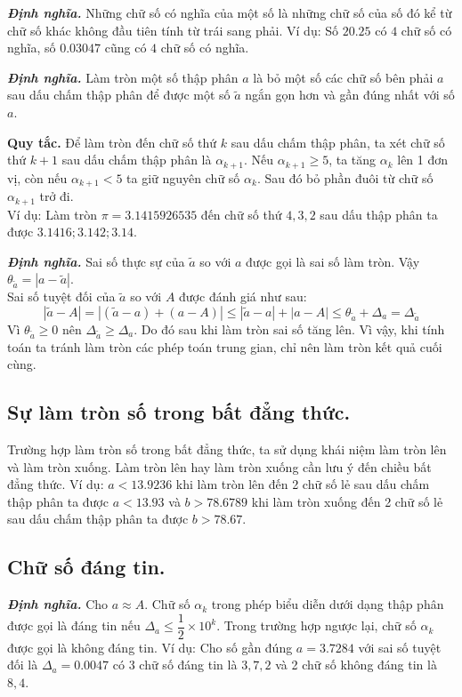 \documentclass[12pt, a4paper]{report}
\def\DN{\textbf{\textit{Định nghĩa. }}}
\begin{document}
\DN Những chữ số có nghĩa của một số là những chữ số của số đó kể từ chữ số khác không đầu tiên tính từ trái sang phải. Ví dụ: Số $20.25$ có $4$ chữ số có nghĩa, số $0.03047$ cũng có $4$ chữ số có nghĩa.

\DN Làm tròn một số thập phân $a$ là bỏ một số các chữ số bên phải $a$ sau dấu chấm thập phân để được một số $\tilde{a}$ ngắn gọn hơn và gần đúng nhất với số $a$. 

\textbf{Quy tắc.} Để làm tròn đến chữ số thứ $k$ sau dấu chấm thập phân, ta xét chữ số thứ $k+1$ sau dấu chấm thập phân là $\alpha_{k+1}$. Nếu $\alpha_{k+1} \geq 5$, ta tăng $\alpha_{k}$ lên 1 đơn vị, còn nếu $\alpha_{k+1} < 5$ ta giữ nguyên chữ số $\alpha_{k}$. Sau đó bỏ phần đuôi từ chữ số $\alpha_{k+1}$ trở đi.\\
Ví dụ: Làm tròn $\pi = 3.1415926535$ đến chữ số thứ $4,3,2$ sau dấu thập phân ta được $3.1416; 3.142;3.14$.

\DN Sai số thực sự của $\tilde{a}$ so với $a$ được gọi là sai số làm tròn. Vậy $\theta_{\tilde{a}} =|a - \tilde{a}|$.\\
Sai số tuyệt đối của $\tilde{a}$ so với $A$ được đánh giá như sau:
\[
    |\tilde{a} - A| = |(\tilde{a} - a) + (a-A)| \leq |\tilde{a}-a| + |a - A| \leq \theta_{\tilde{a}} + \Delta_a = \Delta_{\tilde{a}}
\]
Vì $\theta_{\tilde{a}} \geq 0$ nên $\Delta_{\tilde{a}} \geq \Delta_a$. Do đó sau khi làm tròn sai số tăng lên. Vì vậy, khi tính toán ta tránh làm tròn các phép toán trung gian, chỉ nên làm tròn kết quả cuối cùng.
\subsection{Sự làm tròn số trong bất đẳng thức.}
Trường hợp làm tròn số trong bất đẳng thức, ta sử dụng khái niệm làm tròn lên và làm tròn xuống. Làm tròn lên hay làm tròn xuống cần lưu ý đến chiều bất đẳng thức. Ví dụ: $a<13.9236$ khi làm tròn lên đến 2 chữ số lẻ sau dấu chấm thập phân ta được $a < 13.93$ và $b > 78.6789$ khi làm tròn xuống đến 2 chữ số lẻ sau dấu chấm thập phân ta được $b > 78.67$.
\subsection{Chữ số đáng tin.}
\DN Cho $a \approx A.$ Chữ số $\alpha_k$ trong phép biểu diễn dưới dạng thập phân được gọi là đáng tin nếu $\Delta_a \leq \dfrac{1}{2} \times 10^k$. Trong trường hợp ngược lại, chữ số $\alpha_k$ được gọi là không đáng tin. Ví dụ: Cho số gần đúng $a = 3.7284$ với sai số tuyệt đối là $\Delta_a = 0.0047$ có 3 chữ số đáng tin là $3,7,2$ và 2 chữ số không đáng tin là $8,4$.
\end{document}
